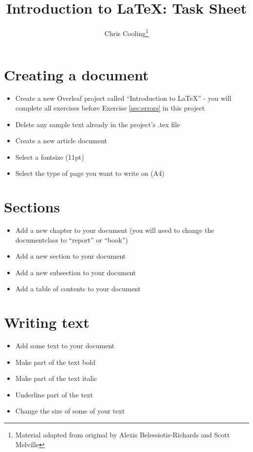 \documentclass[11pt,a4paper]{article}
\begin{document}
\title{Introduction to \LaTeX: Task Sheet}
\author{Chris Cooling\thanks{Material adapted from original by Alexis Belessiotis-Richards and Scott Melville}}
\maketitle
\pagestyle{empty}
\thispagestyle{empty}

\section{Creating a document}
\begin{itemize}
\item Create a new Overleaf project called ``Introduction to LaTeX'' - you will complete all exercises before Exercise \ref{sec:errors} in this project
\item Delete any sample text already in the project's .tex file
\item Create a new article document
\item Select a fontsize (11pt)
\item Select the type of page you want to write on (A4)
\end{itemize}

\section{Sections}
\begin{itemize}
\item Add a new chapter to your document (you will need to change the documentclass to ``report'' or ``book'')
\item Add a new section to your document
\item Add a new subsection to your document
\item Add a table of contents to your document
\end{itemize}

\section{Writing text}
\begin{itemize}
\item Add some text to your document
\item Make part of the text bold
\item Make part of the text italic
\item Underline part of the text
\item Change the size of some of your text
\end{itemize}
\end{document}
